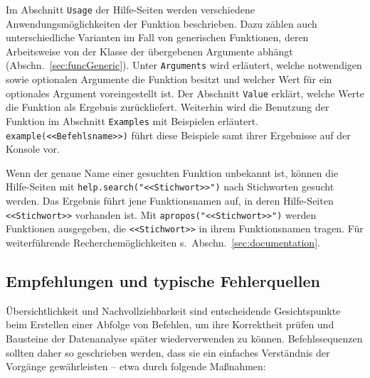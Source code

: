 Im Abschnitt \lstinline!Usage! der Hilfe-Seiten werden verschiedene Anwendungsmöglichkeiten der Funktion beschrieben. Dazu zählen auch unterschiedliche Varianten im Fall von generischen Funktionen, deren Arbeitsweise von der Klasse der übergebenen Argumente abhängt (Abschn.\ \ref{sec:funcGeneric}). Unter \lstinline!Arguments! wird erläutert, welche notwendigen sowie optionalen Argumente die Funktion besitzt und welcher Wert für ein optionales Argument voreingestellt ist. Der Abschnitt \lstinline!Value! erklärt, welche Werte die Funktion als Ergebnis zurückliefert. Weiterhin wird die Benutzung der Funktion im Abschnitt \lstinline!Examples! mit Beispielen erläutert.  \lstinline!example(<<Befehlsname>>)! führt diese Beispiele samt ihrer Ergebnisse auf der Konsole vor.

Wenn der genaue Name einer gesuchten Funktion unbekannt ist, können die Hilfe-Seiten mit \lstinline!help.search("<<Stichwort>>")! nach Stichworten gesucht werden. Das Ergebnis führt jene Funktionsnamen auf, in deren Hilfe-Seiten \lstinline!<<Stichwort>>! vorhanden ist. Mit \lstinline!apropos("<<Stichwort>>")! werden Funktionen ausgegeben, die \lstinline!<<Stichwort>>! in ihrem Funktionsnamen tragen. Für weiterführende Recherchemöglichkeiten s.\ Abschn.\ \ref{sec:documentation}.


\subsection{Empfehlungen und typische Fehlerquellen}
\label{sec:mistakes}

Übersichtlichkeit und Nachvollziehbarkeit sind entscheidende Gesichtspunkte beim Erstellen einer Abfolge von Befehlen, um ihre Korrektheit prüfen und Bausteine der Datenanalyse später wiederverwenden zu können. Befehlssequenzen sollten daher so geschrieben werden, dass sie ein einfaches Verständnis der Vorgänge gewährleisten -- etwa durch folgende Maßnahmen:

